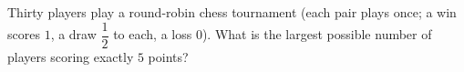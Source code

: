Thirty players play a round-robin chess tournament (each pair plays once; a win scores $1$, a draw $\dfrac12$ to each, a loss $0$). What is the largest possible number of players scoring exactly $5$ points?
